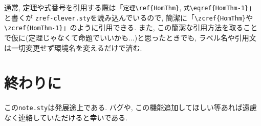 \documentclass[
	paper=a4,
	fontsize=10pt, %
	jafontsize=12Q,
	jafontscale=0.92,
]{jlreq}
\begin{document}
通常, 定理や式番号を引用する際は「\verb|定理\ref{HomThm}|, \verb|式\eqref{HomThm-1}|」と書くが
\texttt{zref-clever.sty}を読み込んでいるので, 簡潔に「\verb|\zcref{HomThm}|や\verb|\zcref{HomThm-1}|」のように引用できる.
また, この簡潔な引用方法を取ることで仮に(定理じゃなくて命題でいいかも...)と思ったときでも, ラベル名や引用文は一切変更せず環境名を変えるだけで済む.

\section{終わりに}

この\texttt{note.sty}は発展途上である.
バグや, この機能追加してほしい等あれば遠慮なく連絡していただけると幸いである.
\\

\lipsum[2-3]


\newpage
\nocite{*}
\printbibliography[title=参考文献]
\end{document}
